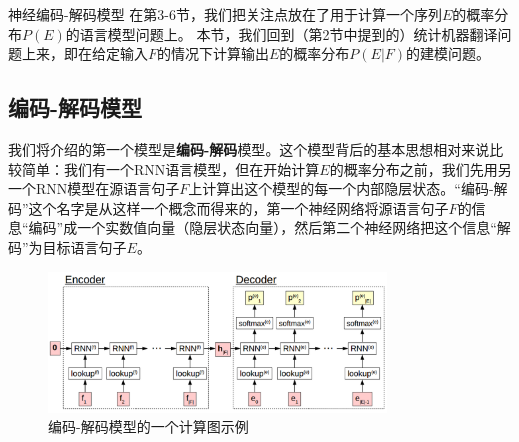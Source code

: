 \documentclass[10pt,a4paper]{ctexart}
\makeatletter
\renewcommand{\section}{\@startsection{section}{1}{0mm}
  {-\baselineskip}{0.5\baselineskip}{\bf\leftline}}
\makeatother
\begin{document}

\newpage

\section{神经编码-解码模型}
在第3-6节，我们把关注点放在了用于计算一个序列$E$的概率分布$P(E)$的语言模型问题上。
本节，我们回到（第2节中提到的）统计机器翻译问题上来，即在给定输入$F$的情况下计算输出$E$的概率分布$P(E | F)$的建模问题。

\subsection{编码-解码模型}
我们将介绍的第一个模型是\textbf{编码-解码}模型\cite{chrisman1991learning,forcada1997recursive,kalchbrenner2013recurrent,sutskever2014sequence}。这个模型背后的基本思想相对来说比较简单：我们有一个RNN语言模型，但在开始计算$E$的概率分布之前，我们先用另一个RNN模型在源语言句子$F$上计算出这个模型的每一个内部隐层状态。“编码-解码”这个名字是从这样一个概念而得来的，第一个神经网络将源语言句子$F$的信息“编码”成一个实数值向量（隐层状态向量），然后第二个神经网络把这个信息“解码”为目标语言句子$E$。

\begin{figure}[H]
\centering
\includegraphics[width=0.8\textwidth]{fig21.png}
\caption{编码-解码模型的一个计算图示例}
\label{fig:21}
\end{figure}
\end{document}
